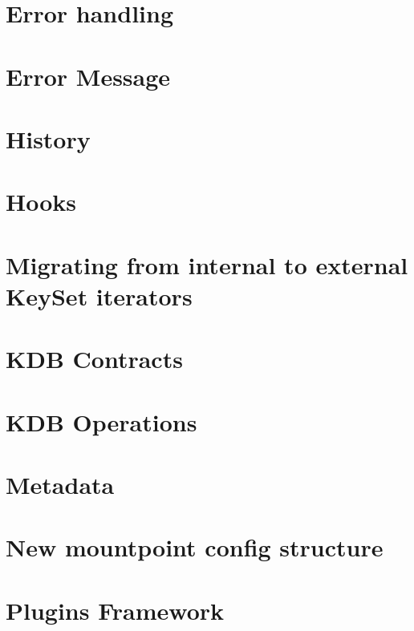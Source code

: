 \let\mypdfximage\pdfximage\def\pdfximage{\immediate\mypdfximage}\documentclass[twoside]{book}
\newcommand{\+}{\discretionary{\mbox{\scriptsize$\hookleftarrow$}}{}{}}
\begin{document}
\chapter{Error handling}
\label{doc_dev_error-handling_md}

\chapter{Error Message}
\label{doc_dev_error-message_md}

\chapter{History}
\label{doc_dev_history_md}

\chapter{Hooks}
\label{doc_dev_hooks_md}

\chapter{Migrating from internal to external Key\+Set iterators}
\label{doc_dev_iterators_md}

\chapter{KDB Contracts}
\label{doc_dev_kdb-contracts_md}

\chapter{KDB Operations}
\label{doc_dev_kdb-operations_md}

\chapter{Metadata}
\label{doc_dev_metadata_md}

\chapter{New mountpoint config structure}
\label{doc_dev_mountpoints_md}

\chapter{Plugins Framework}
\label{doc_dev_plugins-framework_md}

\end{document}
